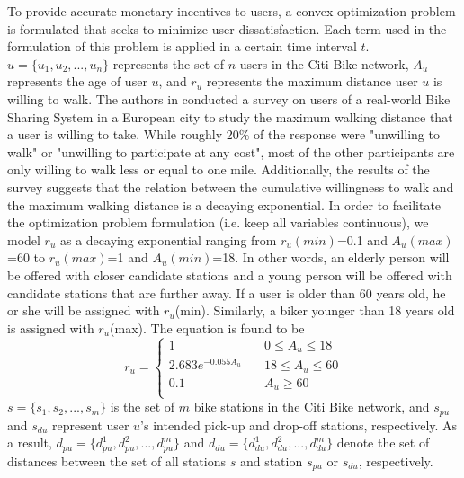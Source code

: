 \documentclass[times, 10pt,twocolumn]{article}
\begin{document}
To provide accurate monetary incentives to users, a convex optimization problem is formulated that seeks to minimize user dissatisfaction. Each term used in the formulation of this problem is applied in a certain time interval $t$. $u = \{u_1, u_2, ..., u_n\}$ represents the set of $n$ users in the Citi Bike network, $A_u$ represents the age of user $u$, and $r_u$ represents the maximum distance user $u$ is willing to walk. The authors in \cite{incentives} conducted a survey on users of a real-world Bike Sharing System in a European city to study the maximum walking distance that a user is willing to take. While roughly 20\% of the response were "unwilling to walk" or "unwilling to participate at any cost", most of the other participants are only willing to walk less or equal to one mile. Additionally, the results of the survey suggests that the relation between the cumulative willingness to walk and the maximum walking distance is a decaying exponential. In order to facilitate the optimization problem formulation (i.e. keep all variables continuous), we model $r_u$ as a decaying exponential ranging from $r_u(min)$=0.1 and $A_u(max)$=60 to $r_u(max)$=1 and $A_u(min)$=18. In other words, an elderly person will be offered with closer candidate stations and a young person will be offered with candidate stations that are further away. If a user is older than 60 years old, he or she will be assigned with $r_u$(min). Similarly, a biker younger than 18 years old is assigned with $r_u$(max). The equation is found to be
\begin{equation}
r_u = \left\{
        \begin{array}{lll}
            1 & \quad 0 \leq A_u \leq 18 \\
            2.683e^{-0.055A_u} & \quad 18 \leq A_u \leq 60 \\
            0.1 & \quad A_u \geq 60 \\
        \end{array}
    \right.
\end{equation}
$s = \{s_1, s_2, ..., s_m\}$ is the set of $m$ bike stations in the Citi Bike network, and $s_{pu}$ and $s_{du}$ represent user $u$'s intended pick-up and drop-off stations, respectively. As a result, $d_{pu} = \{d_{pu}^1, d_{pu}^2, ..., d_{pu}^m\}$ and $d_{du} = \{d_{du}^1, d_{du}^2, ..., d_{du}^m\}$ denote the set of distances between the set of all stations $s$ and station $s_{pu}$ or $s_{du}$, respectively.
\end{document}

